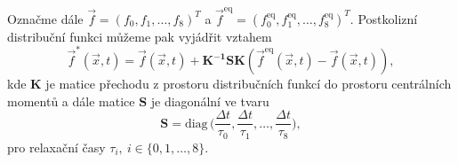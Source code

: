 Označme dále $ \vec{f} = \left(f_{0}, f_{1}, \dots, f_{8} \right)^T$ a $ \vec{f}^{\mathrm{eq}}= \left(f^{\mathrm{eq}}_{0}, f^{\mathrm{eq}}_{1}, \dots, f^{\mathrm{eq}}_{8} \right)^T $.
Postkolizní distribuční funkci můžeme pak vyjádřit vztahem
\begin{equation}\label{eq:srt_f}
\vec{f}^{*}(\vec{x}, t) = \vec{f}(\vec{x}, t) + \mathbf{K^{-1}}\mathbf{S}\mathbf{K} (\vec{f}^{\mathrm{eq}}(\vec{x}, t) - \vec{f}(\vec{x}, t)),
\end{equation}
kde $ \mathbf{K} $ je matice přechodu z prostoru distribučních funkcí do prostoru centrálních momentů a dále matice $ \mathbf{S} $ je diagonální ve tvaru
\begin{equation}\label{eq:srt_matrixS}
\mathbf{S} = \mathrm{diag} \, \Bigg( \frac{\Delta t}{\tau_{0}}, \frac{\Delta t}{\tau_{1}}, \dots, \frac{\Delta t}{\tau_{8}} \Bigg),
\end{equation}
pro relaxační časy $ \tau_{i}, \ i \in \{0, 1, \dots, 8\}$.


